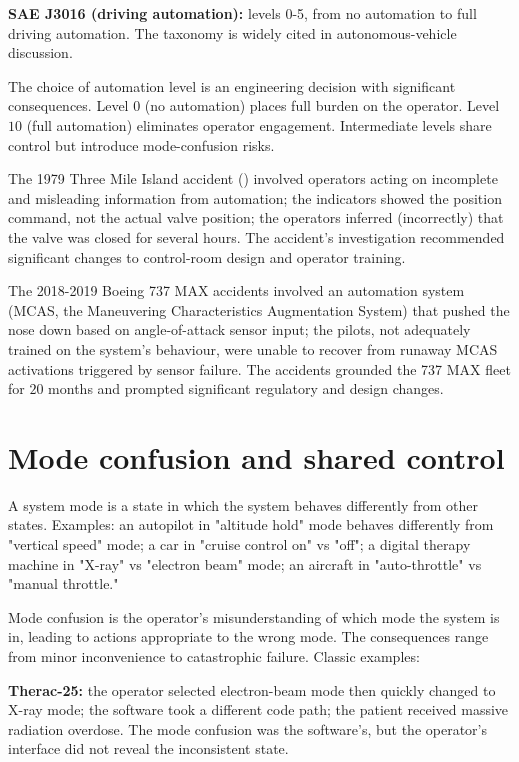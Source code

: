 \textbf{SAE J3016 (driving automation):} levels 0-5, from no automation to full driving automation. The taxonomy is widely cited in autonomous-vehicle discussion.

The choice of automation level is an engineering decision with significant consequences. Level $0$ (no automation) places full burden on the operator. Level $10$ (full automation) eliminates operator engagement. Intermediate levels share control but introduce mode-confusion risks.

The 1979 Three Mile Island accident (\cite{acc:kemeny-tmi-1979}) involved operators acting on incomplete and misleading information from automation; the indicators showed the position command, not the actual valve position; the operators inferred (incorrectly) that the valve was closed for several hours. The accident's investigation recommended significant changes to control-room design and operator training.

The 2018-2019 Boeing 737 MAX accidents involved an automation system (MCAS, the Maneuvering Characteristics Augmentation System) that pushed the nose down based on angle-of-attack sensor input; the pilots, not adequately trained on the system's behaviour, were unable to recover from runaway MCAS activations triggered by sensor failure. The accidents grounded the 737 MAX fleet for $20$ months and prompted significant regulatory and design changes.

\section{Mode confusion and shared control}

A system mode is a state in which the system behaves differently from other states. Examples: an autopilot in "altitude hold" mode behaves differently from "vertical speed" mode; a car in "cruise control on" vs "off"; a digital therapy machine in "X-ray" vs "electron beam" mode; an aircraft in "auto-throttle" vs "manual throttle."

Mode confusion is the operator's misunderstanding of which mode the system is in, leading to actions appropriate to the wrong mode. The consequences range from minor inconvenience to catastrophic failure. Classic examples:

\textbf{Therac-25:} the operator selected electron-beam mode then quickly changed to X-ray mode; the software took a different code path; the patient received massive radiation overdose. The mode confusion was the software's, but the operator's interface did not reveal the inconsistent state.

